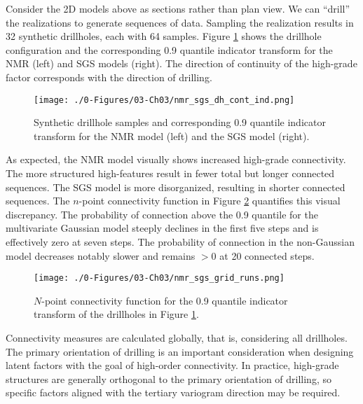 Consider the \gls{2D} models above as sections rather than plan view. We can ``drill'' the realizations to generate sequences of data. Sampling the realization results in 32 synthetic drillholes, each with 64 samples. Figure \ref{fig:nmr_sgs_dh_cont_ind} shows the drillhole configuration and the corresponding 0.9 quantile indicator transform for the \gls{NMR} (left) and \gls{SGS} models (right). The direction of continuity of the high-grade factor corresponds with the direction of drilling.

\begin{figure}[htb!]
    \centering
    \texttt{[image: ./0-Figures/03-Ch03/nmr\_sgs\_dh\_cont\_ind.png]}
    \caption{ Synthetic drillhole samples and corresponding 0.9 quantile indicator transform for the \gls{NMR} model (left) and the \gls{SGS} model (right).}
    \label{fig:nmr_sgs_dh_cont_ind}
\end{figure}

As expected, the \gls{NMR} model visually shows increased high-grade connectivity. The more structured high-features result in fewer total but longer connected sequences. The \gls{SGS} model is more disorganized, resulting in shorter connected sequences. The $n$-point connectivity function in Figure \ref{fig:nmr_sgs_grid_runs} quantifies this visual discrepancy. The probability of connection above the 0.9 quantile for the multivariate Gaussian model steeply declines in the first five steps and is effectively zero at seven steps. The probability of connection in the non-Gaussian model decreases notably slower and remains $> 0$ at 20 connected steps.

\begin{figure}[htb!]
    \centering
    \texttt{[image: ./0-Figures/03-Ch03/nmr\_sgs\_grid\_runs.png]}
    \caption{ $N$-point connectivity function for the 0.9 quantile indicator transform of the drillholes in Figure \ref{fig:nmr_sgs_dh_cont_ind}.}
    \label{fig:nmr_sgs_grid_runs}
\end{figure}

Connectivity measures are calculated globally, that is, considering all drillholes. The primary orientation of drilling is an important consideration when designing latent factors with the goal of high-order connectivity. In practice, high-grade structures are generally orthogonal to the primary orientation of drilling, so specific factors aligned with the tertiary variogram direction may be required.


